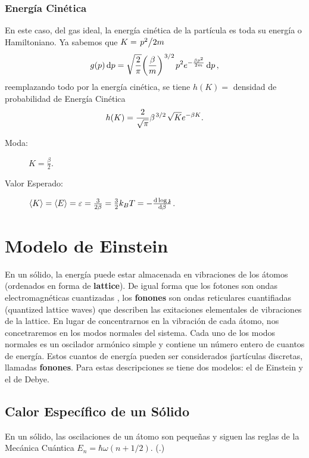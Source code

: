 \subsection{Energía Cinética}
En este caso, del gas ideal, la energía cinética de la partícula es toda su energía o Hamiltoniano. Ya sabemos que $K = \flatfrac{p^2}{2m}$
    $$ g(p) \dd{p} = \sqrt{\frac{2}{\pi}} \qty(\frac{\beta}{m})^{\flatfrac{3}{2}} p^2 e^{-\frac{\beta p^2}{2m}} \dd{p}, $$
reemplazando todo por la energía cinética, se tiene $h(K) = $ densidad de probabilidad de Energía Cinética
    $$ h(K) = \frac{2}{\sqrt{\pi}} \beta ^{\flatfrac{3}{2}} \sqrt{K} e^{-\beta K}. $$
\begin{description}
    \item[Moda: ] $K = \frac{\beta}{2}$.
    \item[Valor Esperado: ] $\expval{K} = \expval{E} = \varepsilon = \frac{3}{2\beta} = \frac{3}{2} k_B T = -\dv{\log{\mathfrak{z}}}{\beta} $.
\end{description}

\chapter{Modelo de Einstein}
En un sólido, la energía puede estar almacenada en vibraciones de los átomos (ordenados en forma de \textbf{lattice}). De igual forma que los fotones son ondas electromagnéticas cuantizadas , los \textbf{fonones} son ondas reticulares cuantifiadas (quantized lattice waves) que describen las exitaciones elementales de vibraciones de la lattice. En lugar de concentrarnos en la vibración de cada átomo, nos concetraremos en los modos normales del sistema. Cada uno de los modos normales es un oscilador armónico simple y contiene un número entero de cuantos de energía. Estos cuantos de energía pueden ser considerados \" partículas \" discretas, llamadas \textbf{fonones}. Para estas descripciones se tiene dos modelos: el de Einstein y el de Debye.


\section{Calor Específico de un Sólido}
En un sólido, las oscilaciones de un átomo son pequeñas y siguen las reglas de la Mecánica Cuántica $E_n = \hbar \omega (n + 1/2).$ (.) \\

